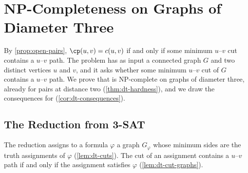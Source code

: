 \section{NP-Completeness on Graphs of Diameter Three}
\label{sec:dt-diameter-three}

By \cref{prop:open-pairs}, $\cp(u, v) = c(u, v)$ if and only if some minimum $u$--$v$ cut contains a $u$--$v$ path.
The problem \PathInMinCut{} has as input a connected graph $G$ and two distinct vertices $u$ and $v$, and it asks whether some minimum $u$--$v$ cut of $G$ contains a $u$--$v$ path.
We prove that \PathInMinCut{} is NP-complete on graphs of diameter three, already for pairs at distance two (\cref{thm:dt-hardness}), and we draw the consequences for \MinCutPath{} (\cref{cor:dt-consequences}).

\subsection{The Reduction from 3-SAT}
\label{sec:dt-construction}

The reduction assigns to a formula $\varphi$ a graph $G_\varphi$ whose minimum sides are the truth assignments of $\varphi$ (\cref{lem:dt-cuts}).
The cut of an assignment contains a $u$--$v$ path if and only if the assignment satisfies $\varphi$ (\cref{lem:dt-cut-graphs}).

